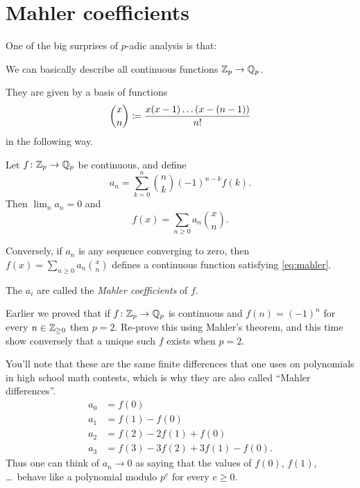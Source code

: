 %

\section{Mahler coefficients}
One of the big surprises of $p$-adic analysis is that:
\begin{moral}
	We can basically describe all continuous functions $\mathbb Z_p \to \mathbb Q_p$.
\end{moral}
They are given by a basis of functions
\[ \binom xn \coloneqq \frac{x(x-1) \dots (x-(n-1))}{n!} \]
in the following way.
\begin{theorem}
	Let $f \colon \mathbb Z_p \to \mathbb Q_p$ be continuous, and define
	\begin{equation}
		a_n = \sum_{k=0}^n \binom nk (-1)^{n-k} f(k).
		\label{eq:mahler}
	\end{equation}
	Then $\lim_n a_n = 0$ and \[ f(x) = \sum_{n \ge 0} a_n \binom xn. \]

	Conversely, if $a_n$ is any sequence converging to zero,
	then $f(x) = \sum_{n \ge 0} a_n \binom xn$
	defines a continuous function satisfying \eqref{eq:mahler}.
\end{theorem}
The $a_i$ are called the \emph{Mahler coefficients} of $f$.
\begin{exercise}
	Earlier we proved that if $f \colon \mathbb Z_p \to \mathbb Q_p$ is continuous
	and $f(n) = (-1)^n$ for every $n \in \mathbb Z_{\ge 0}$ then $p = 2$.
	Re-prove this using Mahler's theorem,
	and this time show conversely that a unique such $f$ exists when $p=2$.
\end{exercise}

You'll note that these are the same finite differences that one
uses on polynomials in high school math contests,
which is why they are also called ``Mahler differences''.
\begin{align*}
	a_0 &= f(0) \\
	a_1 &= f(1) - f(0) \\
	a_2 &= f(2) - 2f(1) + f(0) \\
	a_3 &= f(3) - 3f(2) + 3f(1) - f(0).
\end{align*}
Thus one can think of $a_n \to 0$ as saying that
the values of $f(0)$, $f(1)$, \dots\ behave like a polynomial modulo $p^e$
for every $e \ge 0$.

